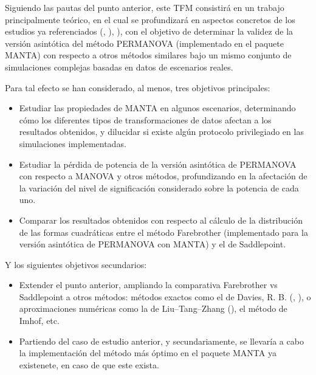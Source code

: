 \documentclass[IB,BIB]{TFUOC}%
\begin{document}
Siguiendo las pautas del punto anterior, este TFM consistirá en un trabajo principalmente teórico, en el cual se profundizará en aspectos concretos de los estudios ya referenciados (\cite{garrido-martin_fast_2022}, \cite{garrido-martin_identification_2021}), \cite{monlong_identification_2014}), con el objetivo de determinar la validez de la versión asintótica del método PERMANOVA (implementado en el paquete MANTA) con respecto a otros métodos similares bajo un mismo conjunto de simulaciones complejas basadas en datos de escenarios reales.



Para tal efecto se han considerado, al menos, tres objetivos principales:

{\small
\begin{itemize}
    \item Estudiar las propiedades de MANTA en algunos escenarios, determinando cómo los diferentes tipos de transformaciones de datos afectan a los resultados obtenidos, y dilucidar si existe algún protocolo privilegiado en las simulaciones implementadas.
    \item Estudiar la pérdida de potencia de la versión asintótica de PERMANOVA con respecto a MANOVA y otros métodos, profundizando en la afectación de la variación del nivel de significación considerado sobre la potencia de cada uno.
    \item Comparar los resultados obtenidos con respecto al cálculo de la distribución de las formas cuadráticas entre el método Farebrother (implementado para la versión asintótica de PERMANOVA con MANTA) y el de Saddlepoint.
\end{itemize}}

Y los siguientes objetivos secundarios:

{\small
\begin{itemize}
    \item Extender el punto anterior, ampliando la comparativa Farebrother vs Saddlepoint a otros métodos: métodos exactos como el de Davies, R. B. (\cite{davies_numerical_1973}, \cite{davies_algorithm_1980}), o aproximaciones numéricas como la de Liu–Tang–Zhang (\cite{qi_genetic_2022}), el método de Imhof, etc.
    \item Partiendo del caso de estudio anterior, y secundariamente, se llevaría a cabo la implementación del método más óptimo en el paquete MANTA ya existenete, en caso de que este exista.
\end{itemize}}
\end{document}
